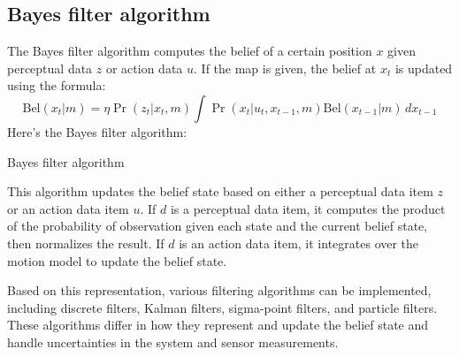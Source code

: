 \subsection{Bayes filter algorithm}
The Bayes filter algorithm computes the belief of a certain position $x$ given perceptual data $z$ or action data $u$. 
If the map is given, the belief at $x_t$ is updated using the formula:
\[\text{Bel}(x_t|m)=\eta\Pr(z_t|x_t,m)\int\Pr(x_t|u_t,x_{t-1},m)\text{Bel}(x_{t-1}|m)\,dx_{t-1}\]
Here's the Bayes filter algorithm:
\begin{algorithm}[H]
    \caption{Bayes filter algorithm}
        \begin{algorithmic}[1]
                \EndFor
                \EndFor
            \EndIf
            \State {}
        \end{algorithmic}
\end{algorithm}
This algorithm updates the belief state based on either a perceptual data item $z$ or an action data item $u$. 
If $d$ is a perceptual data item, it computes the product of the probability of observation given each state and the current belief state, then normalizes the result.
If $d$ is an action data item, it integrates over the motion model to update the belief state.

Based on this representation, various filtering algorithms can be implemented, including discrete filters, Kalman filters, sigma-point filters, and particle filters. 
These algorithms differ in how they represent and update the belief state and handle uncertainties in the system and sensor measurements.

